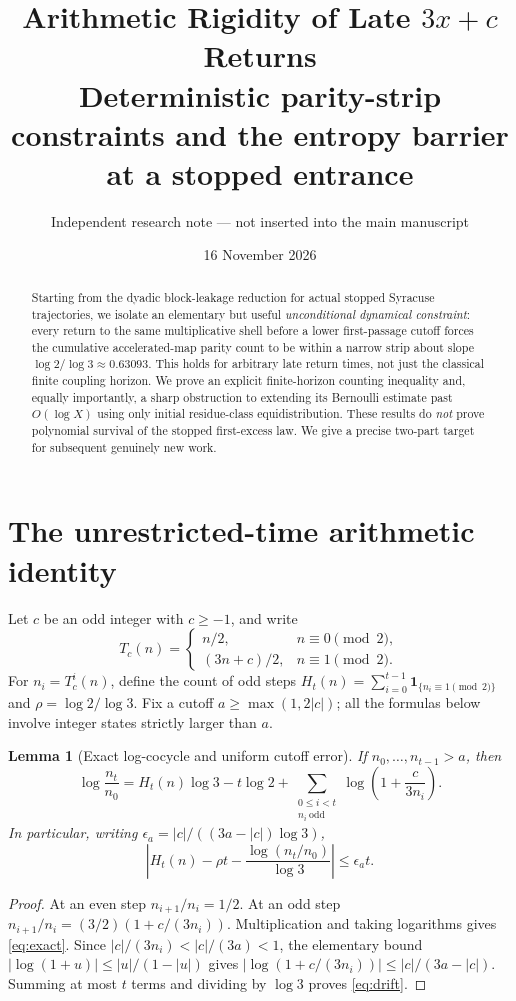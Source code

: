 \documentclass[11pt,a4paper]{article}
\title{Arithmetic Rigidity of Late $3x+c$ Returns\\
\large Deterministic parity-strip constraints and the entropy barrier at a stopped entrance}
\author{Independent research note --- not inserted into the main manuscript}
\date{16 November 2026}
\newtheorem{lemma}[theorem]{Lemma}
\theoremstyle{remark}
\newcommand{\ind}{\mathbf 1}
\begin{document}
\maketitle
\begin{abstract}
Starting from the dyadic block-leakage reduction for
actual stopped Syracuse trajectories, we isolate an elementary but useful
\emph{unconditional dynamical constraint}: every return to the same
multiplicative shell before a lower first-passage cutoff forces the
cumulative accelerated-map parity count to be within a narrow strip about
slope $\log 2/\log 3\approx0.63093$.  This holds for arbitrary late
return times, not just the classical finite coupling horizon.  We prove
an explicit finite-horizon counting inequality and, equally importantly,
a sharp obstruction to extending its Bernoulli estimate past $O(\log X)$
using only initial residue-class equidistribution.  These results do
\emph{not} prove polynomial survival of the stopped first-excess law.
We give a precise two-part target for subsequent genuinely new work.
\end{abstract}

\section{The unrestricted-time arithmetic identity}
Let $c$ be an odd integer with $c\ge-1$, and write
\[
 T_c(n)=\begin{cases}n/2,&n\equiv0\pmod2,\\(3n+c)/2,&n\equiv1\pmod2.\end{cases}
\]
For $n_i=T_c^i(n)$, define the count of odd steps
$H_t(n)=\sum_{i=0}^{t-1}\ind_{\{n_i\equiv1\pmod2\}}$ and
$\rho=\log 2/\log 3$.
Fix a cutoff $a\ge\max(1,2|c|)$; all the formulas below involve
integer states strictly larger than $a$.

\begin{lemma}[Exact log-cocycle and uniform cutoff error]\label{lem:cocycle}
If $n_0,\ldots,n_{t-1}>a$, then
\begin{equation}\label{eq:exact}
 \log\frac{n_t}{n_0}=H_t(n)\log3-t\log2+
 \sum_{\substack{0\le i<t\\ n_i\ \mathrm{odd}}}
 \log\!\left(1+\frac{c}{3n_i}\right).
\end{equation}
In particular, writing
$\epsilon_a=|c|/((3a-|c|)\log3)$,
\begin{equation}\label{eq:drift}
\left|H_t(n)-\rho t-\frac{\log(n_t/n_0)}{\log3}\right|
\le \epsilon_a t.
\end{equation}
\end{lemma}
\begin{proof}
At an even step $n_{i+1}/n_i=1/2$.  At an odd step
$n_{i+1}/n_i=(3/2)(1+c/(3n_i))$. Multiplication and taking
logarithms gives \eqref{eq:exact}. Since $|c|/(3n_i)<|c|/(3a)<1$,
the elementary bound $|\log(1+u)|\le |u|/(1-|u|)$ gives
$|\log(1+c/(3n_i))|\le |c|/(3a-|c|)$.
Summing at most $t$ terms and dividing by $\log3$ proves
\eqref{eq:drift}.
\end{proof}
\end{document}
